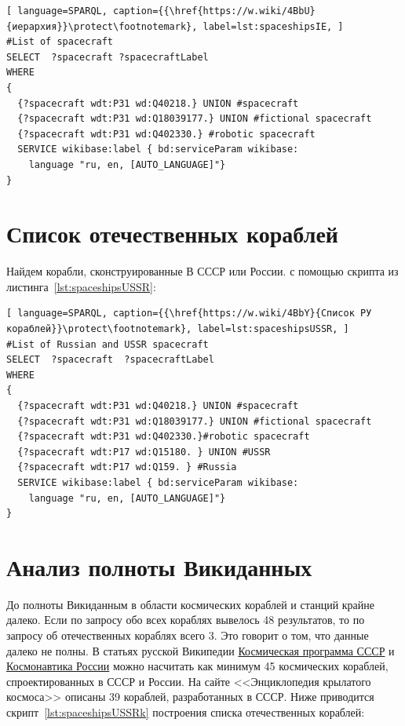 \begin{lstlisting}[ language=SPARQL, caption={{\href{https://w.wiki/4BbU}{иерархия}}\protect\footnotemark}, label=lst:spaceshipsIE, ]
#List of spacecraft 
SELECT  ?spacecraft ?spacecraftLabel   
WHERE
{
  {?spacecraft wdt:P31 wd:Q40218.} UNION #spacecraft
  {?spacecraft wdt:P31 wd:Q18039177.} UNION #fictional spacecraft
  {?spacecraft wdt:P31 wd:Q402330.} #robotic spacecraft
  SERVICE wikibase:label { bd:serviceParam wikibase:
    language "ru, en, [AUTO_LANGUAGE]"}
}
\end{lstlisting}

\section{Список отечественных кораблей}
Найдем корабли, сконструированные В СССР или России. с помощью скрипта из листинга~\ref{lst:spaceshipsUSSR}:

\begin{lstlisting}[ language=SPARQL, caption={{\href{https://w.wiki/4BbY}{Список РУ кораблей}}\protect\footnotemark}, label=lst:spaceshipsUSSR, ]
#List of Russian and USSR spacecraft
SELECT  ?spacecraft  ?spacecraftLabel 
WHERE
{
  {?spacecraft wdt:P31 wd:Q40218.} UNION #spacecraft
  {?spacecraft wdt:P31 wd:Q18039177.} UNION #fictional spacecraft
  {?spacecraft wdt:P31 wd:Q402330.}#robotic spacecraft
  {?spacecraft wdt:P17 wd:Q15180. } UNION #USSR
  {?spacecraft wdt:P17 wd:Q159. } #Russia
  SERVICE wikibase:label { bd:serviceParam wikibase:
    language "ru, en, [AUTO_LANGUAGE]"}
}
\end{lstlisting}

\section{Анализ полноты Викиданных}
До полноты Викиданным в области космических кораблей и станций крайне далеко. Если по запросу обо всех кораблях вывелось 48 результатов, то по запросу об отечественных кораблях всего 3. Это говорит о том, что данные далеко не полны. В статьях русской Википедии \href{https://ru.wikipedia.org/wiki/%D0%9A%D0%BE%D1%81%D0%BC%D0%B8%D1%87%D0%B5%D1%81%D0%BA%D0%B0%D1%8F_%D0%BF%D1%80%D0%BE%D0%B3%D1%80%D0%B0%D0%BC%D0%BC%D0%B0_%D0%A1%D0%A1%D0%A1%D0%A0}{Космическая программа СССР} и \href{https://ru.wikipedia.org/wiki/%D0%9A%D0%BE%D1%81%D0%BC%D0%BE%D0%BD%D0%B0%D0%B2%D1%82%D0%B8%D0%BA%D0%B0_%D0%A0%D0%BE%D1%81%D1%81%D0%B8%D0%B8}{Космонавтика России} можно насчитать как минимум 45 космических кораблей, спроектированных в СССР и России. На сайте <<Энциклопедия крылатого космоса>> описаны 39 кораблей, разработанных в СССР.
Ниже приводится скрипт~\ref{lst:spaceshipsUSSRk} построения списка отечественных кораблей:

